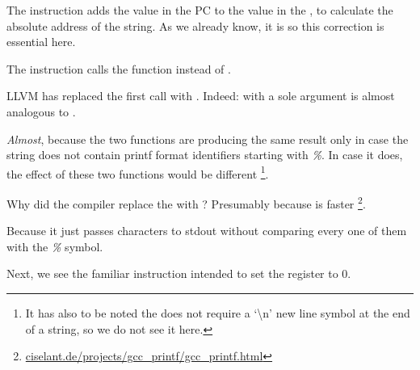 The  instruction adds the value in the \ac{PC} to the value in the , to calculate the absolute address of the  string. 
As we already know, it is \q{\PICcode} so this correction is essential here.

The  instruction calls the \puts function instead of \printf.

\label{puts}

LLVM has replaced the first \printf call with \puts.
Indeed: \printf with a sole argument is almost analogous to \puts. 

\emph{Almost}, because the two functions are producing the same result only in case the 
string does not contain printf format identifiers starting with \emph{\%}. 
In case it does, the effect of these two functions would be different
\footnote{It has also to be noted the \puts does not require a `\textbackslash{}n' new line symbol 
at the end of a string, so we do not see it here.}.

Why did the compiler replace the \printf with \puts? Presumably because \puts is faster
\footnote{\href{http://www.ciselant.de/projects/gcc_printf/gcc_printf.html}{ciselant.de/projects/gcc\_printf/gcc\_printf.html}}. 

Because it just passes characters to \gls{stdout} without comparing every one of them with the \emph{\%} symbol.

Next, we see the familiar  instruction intended to set the  register to 0.
